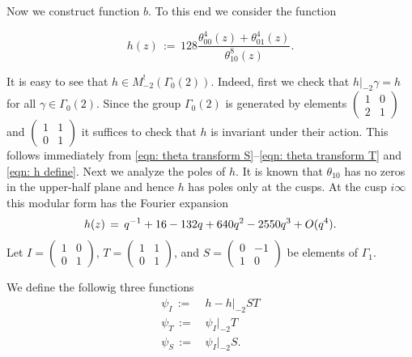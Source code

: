 Now we construct function $b$. To this end we consider the function
\begin{definition}\label{def: h}
\begin{equation}\label{eqn: h define}
  h(z)\,:=\,128 \frac{\theta_{00}^4(z)+\theta_{01}^4(z)}{\theta_{10}^8(z)}.
\end{equation}
\end{definition}
It is easy to see that $h\in M^!_{-2}(\Gamma_0(2))$. Indeed, first we check that $h|_{-2}\gamma=h$
for all $\gamma\in\Gamma_0(2)$. Since the group $\Gamma_0(2)$ is generated by elements
$\left(\begin{smallmatrix}1&0\\2&1\end{smallmatrix}\right)$ and $\left(\begin{smallmatrix}1&1\\0&1\end{smallmatrix}\right)$
it suffices to check that $h$ is invariant under their action. This follows immediately
from \eqref{eqn: theta transform S}--\eqref{eqn: theta transform T} and \eqref{eqn: h define}. Next we analyze the poles of $h$.
It is known \cite[Chapter~I Lemma~4.1]{Mumford} that $\theta_{10}$ has no zeros in the upper-half plane and hence $h$ has poles only at the cusps.
At the cusp $i\infty$ this modular form has the Fourier expansion
\begin{equation}
h(z)\,=\,q^{-1} + 16 - 132 q + 640 q^2 - 2550 q^3+O(q^4).\notag
\end{equation}
Let $I=\left(\begin{smallmatrix}1&0\\0&1\end{smallmatrix}\right)$,
$T=\left(\begin{smallmatrix}1&1\\0&1\end{smallmatrix}\right)$, and
$S=\left(\begin{smallmatrix}0&-1\\1&0\end{smallmatrix}\right)$ be elements of $\Gamma_1$.
\begin{definition}\label{def: psi I psi T psi S}
We define the followig three functions
\begin{align}
  \psi_I\,:=\,&h-h|_{-2}ST \label{eqn: psi I define}\\
  \psi_T\,:=\,&\psi_I|_{-2}T \label{eqn: psi T define}\\
  \psi_S\,:=\,&\psi_I|_{-2}S. \label{eqn: psi S define}
\end{align}
\end{definition}
